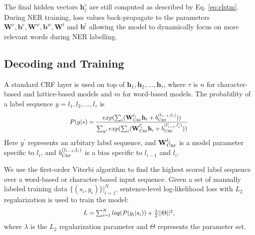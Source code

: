 \documentclass[11pt,a4paper]{article}
\newcommand*{\Scale}[2][4]{\scalebox{#1}{$#2$}}
\begin{document}
\begin{CJK*}{UTF8}{gbsn}
The final hidden vectors $\textbf{h}_j^c$ are still computed as described by Eq. \ref{eq:clstm}. During NER training, loss values back-propagate to the parameters $\textbf{W}^c, \textbf{b}^c, \textbf{W}^w, \textbf{b}^w, \textbf{W}^l$ and $\textbf{b}^l$ allowing the model to dynamically focus on more relevant words during NER labelling. 





\subsection{Decoding and Training}
A standard CRF layer is used on top of $\textbf{h}_1,\textbf{h}_2,\ldots,\textbf{h}_{\tau}$, where $\tau$ is $n$ for character-based and lattice-based models and $m$ for word-based models. The probability of a label sequence $y=l_1,l_2,\ldots,l_{\tau}$ is
\begin{equation}\label{eq:crf}
\Scale[0.9]{
P(y|s)=\dfrac{exp(\sum_{i}(\textbf{W}_\textsc{Crf}^{l_i}\textbf{h}_i + b_\textsc{Crf}^{(l_{i-1},l_i)}))}{\sum_{y^\prime}exp(\sum_{i}(\textbf{W}_\textsc{Crf}^{l_i^\prime}\textbf{h}_i + b_\textsc{Crf}^{(l_{i-1}^\prime, l_i^\prime)}))}
}
\end{equation}
Here $y^\prime$ represents an arbitary label sequence, and $\textbf{W}_\textsc{Crf}^{l_i}$ is  a model parameter specific to $l_i$, and $b_\textsc{Crf}^{(l_{i-1},l_i)}$ is a bias specific to $l_{i-1}$ and $l_i$.

We use the first-order Viterbi algorithm to find the highest scored label sequence over a word-based or character-based input sequence. Given a set of manually labeled training data $\{(s_i, y_i)\}|^N_{i=1}$, sentence-level log-likelihood loss with $L_2$ regularization is used to train the model:
\begin{equation}
\Scale[0.9]{
 L = \sum_{i=1}^{N}log(P(y_i|s_i)) + \frac{\lambda}{2} ||\Theta||^2,
 }
\end{equation}
where $\lambda$ is the $L_2$ regularization parameter and $\Theta$ represents the parameter set.


\end{CJK*}
\end{document}
